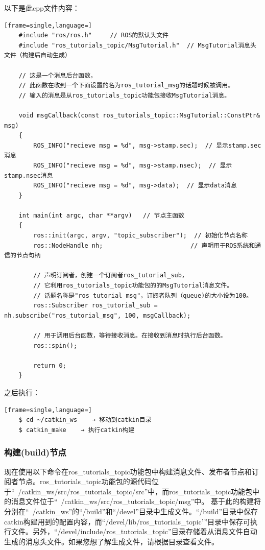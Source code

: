\documentclass[geye,green,kindle,cn]{elegantnote}
\begin{document}
以下是此cpp文件内容：
\begin{lstlisting}[frame=single,language=]
    #include "ros/ros.h"     // ROS的默认头文件 
    #include "ros_tutorials_topic/MsgTutorial.h"  // MsgTutorial消息头文件（构建后自动生成） 
    
    // 这是一个消息后台函数， 
    // 此函数在收到一个下面设置的名为ros_tutorial_msg的话题时候被调用。 
    // 输入的消息是从ros_tutorials_topic功能包接收MsgTutorial消息。 
    
    void msgCallback(const ros_tutorials_topic::MsgTutorial::ConstPtr& msg)
    { 
        ROS_INFO("recieve msg = %d", msg->stamp.sec);  // 显示stamp.sec消息  
        ROS_INFO("recieve msg = %d", msg->stamp.nsec);  // 显示stamp.nsec消息  
        ROS_INFO("recieve msg = %d", msg->data);  // 显示data消息 
    } 
    
    int main(int argc, char **argv)   // 节点主函数 
    {  
        ros::init(argc, argv, "topic_subscriber");  // 初始化节点名称   
        ros::NodeHandle nh;                        // 声明用于ROS系统和通信的节点句柄  
        
        // 声明订阅者，创建一个订阅者ros_tutorial_sub，  
        // 它利用ros_tutorials_topic功能包的的MsgTutorial消息文件。  
        // 话题名称是"ros_tutorial_msg"，订阅者队列（queue)的大小设为100。  
        ros::Subscriber ros_tutorial_sub = nh.subscribe("ros_tutorial_msg", 100, msgCallback);  
        
        // 用于调用后台函数，等待接收消息。在接收到消息时执行后台函数。  
        ros::spin();  
        
        return 0; 
    }
\end{lstlisting}

之后执行：
\begin{lstlisting}[frame=single,language=]
    $ cd ~/catkin_ws    → 移动到catkin目录 
    $ catkin_make    → 执行catkin构建 
\end{lstlisting}
\subsubsection{构建(build)节点}
现在使用以下命令在ros\_tutorials\_topic功能包中构建消息文件、发布者节点和订阅者节点。ros\_tutorials\_topic功能包的源代码位于“~/catkin\_ws/src/ros\_tutorials\_topic/src”中，而ros\_tutorials\_topic功能包中的消息文件位于“~/catkin\_ws/src/ros\_tutorials\_topic/msg”中。 基于此的构建将分别在“~/catkin\_ws”的“/build”和“/devel”目录中生成文件。“/build”目录中保存catkin构建用到的配置内容，而“/devel/lib/ros\_tutorials\_topic’”目录中保存可执行文件。另外，“/devel/include/ros\_tutorials\_topic”目录存储着从消息文件自动生成的消息头文件。如果您想了解生成文件，请根据目录查看文件。
\end{document}
